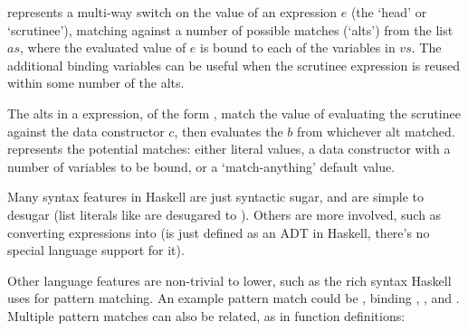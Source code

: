 \documentclass[dissertation.tex]{subfiles}
\begin{document}
{{{            
            
             represents a multi-way switch on the value of an expression \(e\) (the
            `head' or `scrutinee'), matching against a number of possible matches (`alts') from the list \(as\), where
            the evaluated value of \(e\) is bound to each of the variables in \(vs\). The additional binding variables
            can be useful when the scrutinee expression is reused within some number of the alts.

            
            The alts in a  expression, of the form , match the value of
            evaluating the scrutinee against the data constructor \(c\), then evaluates the \(b\) from whichever alt
            matched.  represents the potential matches: either literal values, a data
            constructor with a number of variables to be bound, or a `match-anything' default value.


            Many syntax features in Haskell are just syntactic sugar, and are simple to desugar (list literals like
            \haskell{[1, 2]} are desugared to ). Others are more involved, such as converting
             expressions into 
            (is just defined as an ADT in Haskell, there's no special language support for it).

            
            Other language features are non-trivial to lower, such as the rich syntax Haskell uses for pattern matching.
            An example pattern match could be , binding ,
            , and . Multiple pattern matches can also be related, as in function
            definitions:

}}}
\end{document}
